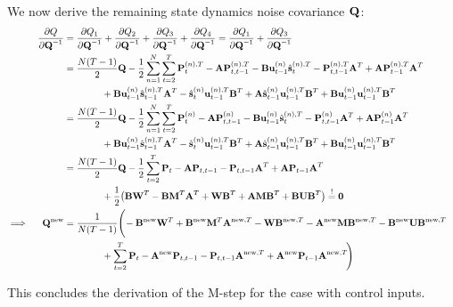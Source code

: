 		We now derive the remaining state dynamics noise covariance \(\mat{Q}\):
		\begin{align*}
			&& \pdv{Q}{\mat{Q}^{-1}}
				&= \pdv{Q_1}{\mat{Q}^{-1}} + \pdv{Q_2}{\mat{Q}^{-1}} + \pdv{Q_3}{\mat{Q}^{-1}} + \pdv{Q_4}{\mat{Q}^{-1}} = \pdv{Q_1}{\mat{Q}^{-1}} + \pdv{Q_3}{\mat{Q}^{-1}} & \\
			&&	&= \frac{N (T - 1)}{2} \mat{Q} - \frac{1}{2} \sum_{n = 1}^{N} \sum_{t = 2}^{T} \mat{P}_t^{(n), T} - \mat{A} \mat{P}_{t, t - 1}^{(n), T} - \mat{B} \vec{u}_{t - 1}^{(n)} \hat{\vec{s}}_t^{(n), T} - \mat{P}_{t, t - 1}^{(n), T} \mat{A}^T + \mat{A} \mat{P}_{t - 1}^{(n), T} \mat{A}^T & \\
				&&&\qquad\qquad + \mat{B} \vec{u}_{t - 1}^{(n)} \hat{\vec{s}}_{t - 1}^{(n), T} \mat{A}^T - \hat{\vec{s}}_t^{(n)} \vec{u}_{t - 1}^{(n), T} \mat{B}^T + \mat{A} \hat{\vec{s}}_{t - 1}^{(n)} \vec{u}_{t - 1}^{(n), T} \mat{B}^T + \mat{B} \vec{u}_{t - 1}^{(n)} \vec{u}_{t - 1}^{(n), T} \mat{B}^T & \\
			&&	&= \frac{N (T - 1)}{2} \mat{Q} - \frac{1}{2} \sum_{n = 1}^{N} \sum_{t = 2}^{T} \mat{P}_t^{(n)} - \mat{A} \mat{P}_{t, t - 1}^{(n)} - \mat{B} \vec{u}_{t - 1}^{(n)} \hat{\vec{s}}_t^{(n), T} - \mat{P}_{t, t - 1}^{(n)} \mat{A}^T + \mat{A} \mat{P}_{t - 1}^{(n)} \mat{A}^T & \\
				&&&\qquad\qquad + \mat{B} \vec{u}_{t - 1}^{(n)} \hat{\vec{s}}_{t - 1}^{(n), T} \mat{A}^T - \hat{\vec{s}}_t^{(n)} \vec{u}_{t - 1}^{(n), T} \mat{B}^T + \mat{A} \hat{\vec{s}}_{t - 1}^{(n)} \vec{u}_{t - 1}^{(n), T} \mat{B}^T + \mat{B} \vec{u}_{t - 1}^{(n)} \vec{u}_{t - 1}^{(n), T} \mat{B}^T & \\
			&&	&= \frac{N (T - 1)}{2} \mat{Q} - \frac{1}{2} \sum_{t = 2}^{T} \mat{P}_t - \mat{A} \mat{P}_{t, t - 1} - \mat{P}_{t, t - 1} \mat{A}^T + \mat{A} \mat{P}_{t - 1} \mat{A}^T & \\
				&&&\qquad\qquad + \frac{1}{2} \big( \mat{B} \mat{W}^T - \mat{B} \mat{M}^T \mat{A}^T + \mat{W} \mat{B}^T + \mat{A} \mat{M} \mat{B}^T + \mat{B} \mat{U} \mat{B}^T \big) \overset{!}{=} \mat{0} & \\
			\implies && \mat{Q}^\new &= \frac{1}{N (T - 1)} \Bigg(\! - \mat{B}^\new \mat{W}^T + \mat{B}^\new \mat{M}^T \mat{A}^{\new, T} - \mat{W} \mat{B}^{\new, T} - \mat{A}^\new \mat{M} \mat{B}^{\new, T} - \mat{B}^\new \mat{U} \mat{B}^{\new, T} \\
				&&&\qquad\qquad + \sum_{t = 2}^{T} \mat{P}_t - \mat{A}^\new \mat{P}_{t, t - 1} - \mat{P}_{t, t - 1} \mat{A}^{\new, T} + \mat{A}^\new \mat{P}_{t - 1} \mat{A}^{\new, T} \!\Bigg) &
		\end{align*}

		This concludes the derivation of the M-step for the case with control inputs.
















